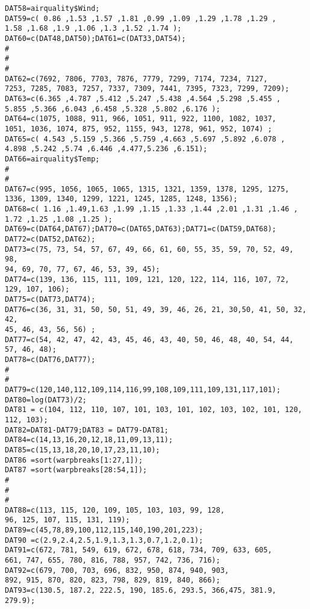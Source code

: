 \documentclass[]{article}
\begin{document}
\begin{verbatim}
DAT58=airquality$Wind;
DAT59=c( 0.86 ,1.53 ,1.57 ,1.81 ,0.99 ,1.09 ,1.29 ,1.78 ,1.29 ,
1.58 ,1.68 ,1.9 ,1.06 ,1.3 ,1.52 ,1.74 );
DAT60=c(DAT48,DAT50);DAT61=c(DAT33,DAT54);
#
#
#
DAT62=c(7692, 7806, 7703, 7876, 7779, 7299, 7174, 7234, 7127,
7253, 7285, 7083, 7257, 7337, 7309, 7441, 7395, 7323, 7299, 7209);
DAT63=c(6.365 ,4.787 ,5.412 ,5.247 ,5.438 ,4.564 ,5.298 ,5.455 ,
5.855 ,5.366 ,6.043 ,6.458 ,5.328 ,5.802 ,6.176 );
DAT64=c(1075, 1088, 911, 966, 1051, 911, 922, 1100, 1082, 1037,
1051, 1036, 1074, 875, 952, 1155, 943, 1278, 961, 952, 1074) ;
DAT65=c( 4.543 ,5.159 ,5.366 ,5.759 ,4.663 ,5.697 ,5.892 ,6.078 ,
4.898 ,5.242 ,5.74 ,6.446 ,4.477,5.236 ,6.151);
DAT66=airquality$Temp;
#
#
DAT67=c(995, 1056, 1065, 1065, 1315, 1321, 1359, 1378, 1295, 1275,
1336, 1309, 1340, 1299, 1221, 1245, 1285, 1248, 1356);
DAT68=c( 1.16 ,1.49,1.63 ,1.99 ,1.15 ,1.33 ,1.44 ,2.01 ,1.31 ,1.46 ,
1.72 ,1.25 ,1.08 ,1.25 );
DAT69=c(DAT64,DAT67);DAT70=c(DAT65,DAT63);DAT71=c(DAT59,DAT68);
DAT72=c(DAT52,DAT62);
DAT73=c(75, 73, 54, 57, 67, 49, 66, 61, 60, 55, 35, 59, 70, 52, 49, 98,
94, 69, 70, 77, 67, 46, 53, 39, 45);
DAT74=c(139, 136, 115, 111, 109, 121, 120, 122, 114, 116, 107, 72, 129, 107, 106);
DAT75=c(DAT73,DAT74);
DAT76=c(36, 31, 31, 50, 50, 51, 49, 39, 46, 26, 21, 30,50, 41, 50, 32, 42,
45, 46, 43, 56, 56) ;
DAT77=c(54, 42, 47, 42, 43, 45, 46, 43, 40, 50, 46, 48, 40, 54, 44, 57, 46, 48);
DAT78=c(DAT76,DAT77);
#
#
DAT79=c(120,140,112,109,114,116,99,108,109,111,109,131,117,101);
DAT80=log(DAT73)/2;
DAT81 = c(104, 112, 110, 107, 101, 103, 101, 102, 103, 102, 101, 120, 112, 103);
DAT82=DAT81-DAT79;DAT83 = DAT79-DAT81;
DAT84=c(14,13,16,20,12,18,11,09,13,11);
DAT85=c(15,13,18,20,10,17,23,11,10);
DAT86 =sort(warpbreaks[1:27,1]);
DAT87 =sort(warpbreaks[28:54,1]);
#
#
#
DAT88=c(113, 115, 120, 109, 105, 103, 103, 99, 128,
96, 125, 107, 115, 131, 119);
DAT89=c(45,78,89,100,112,115,140,190,201,223);
DAT90 =c(2.9,2.4,2.5,1.9,1.3,1.3,0.7,1.2,0.1);
DAT91=c(672, 781, 549, 619, 672, 678, 618, 734, 709, 633, 605,
661, 747, 655, 780, 816, 788, 957, 742, 736, 716);
DAT92=c(679, 700, 703, 696, 832, 950, 874, 940, 903,
892, 915, 870, 820, 823, 798, 829, 819, 840, 866);
DAT93=c(130.5, 187.2, 222.5, 190, 185.6, 293.5, 366,475, 381.9, 279.9);

\end{verbatim}
\end{document}
